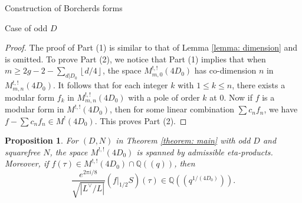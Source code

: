 \documentclass{amsart}
\newcounter{lemma}
\newtheorem{Proposition}[lemma]{Proposition}
\theoremstyle{definition}
\def\Q{\mathbb Q}
\def\gauss#1{\left\lfloor #1\right\rfloor}
\begin{document}
\begin{section}{Construction of Borcherds forms}
\begin{subsection}{Case of odd $D$}
\begin{proof}
The proof of Part (1) is similar to that of Lemma \ref{lemma:
  dimension} and is omitted. To prove Part (2), we notice that Part
(1) implies that when $m\ge 2g-2-\sum_{d|D_0}\gauss{d/4}$, the space
$M^{!,!}_{m,0}(4D_0)$ has co-dimension $n$ in $M^{!,!}_{m,n}(4D_0)$.
It follows that for each integer $k$ with $1\le k\le n$, there exists
a modular form $f_k$ in $M^{!,!}_{m,n}(4D_0)$ with a pole of order $k$ at
$0$. Now if $f$ is a modular form in $M^{!,!}(4D_0)$, then for some
linear combination $\sum c_nf_n$, we have $f-\sum c_nf_n\in M^!(4D_0)$. This proves Part (2).
\end{proof}

\begin{Proposition}
  For $(D,N)$ in Theorem \ref{theorem: main} with odd $D$ and
  squarefree $N$, the space $M^{!,!}(4D_0)$ is spanned by admissible
  eta-products. Moreover, if $f(\tau)\in M^{!,!}(4D_0)\cap\Q((q))$, then
  $$
    \frac{e^{2\pi i/8}}{\sqrt{|L^\vee/L|}}
    (f|_{1/2}S)(\tau)\in\Q((q^{1/(4D_0)})).
  $$
\end{Proposition}


\end{subsection}
\end{section}
\end{document}
